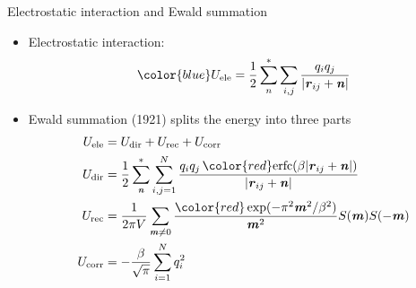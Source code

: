 \documentclass{beamer}
\newcommand{\redc}[1]{{\color{red} #1}}
\newcommand{\bluec}[1]{{\color{blue} #1}}
\newcommand{\vect}[1]{\textbf{\textit{#1}}}
\begin{document}


\begin{frame}{Electrostatic interaction and Ewald summation}
  \begin{itemize}
  \item<1->   Electrostatic interaction:
  \begin{equation*}\bluec{
    U_{\textrm{ele}} = \frac12 \sum^\ast_{n}\sum_{i,j}\frac{q_i q_j}{\vert \vect r_{ij} + \vect n\vert}}
  \end{equation*}
\item <2->
  Ewald summation (1921) splits the
  energy into three parts
  \bluec{
  \begin {align*}
    U_{\textrm{ele}} &=  U_{\textrm{dir}} + U_{\textrm{rec}}+ U_{\textrm{corr}}\\
    U_{\textrm{dir}} & = \frac12 \sum^{\ast}_{\vect n}
    \sum_{i,j = 1}^{N} \frac{q_iq_j\, \redc{\textrm{erfc}(\beta \vert\vect{r}_{ij} + \vect{n}\vert)}}
    {\vert\vect{r}_{ij} + \vect{n}\vert} \\ \label{Erec-ewald}
    U_{\textrm{rec}} & = \frac1{2\pi V} \sum_{\vect m \neq 0}
    \frac{\redc{\exp(-\pi^2\vect m^2 / \beta^2)}}{\vect m^2} S(\vect m) S(-\vect m) \\
    U_{\textrm{corr}}& = -\frac\beta{\sqrt \pi} \sum_{i=1}^N q_i^2
  \end {align*}}
  \end{itemize}
\end{frame}
\end{document}
